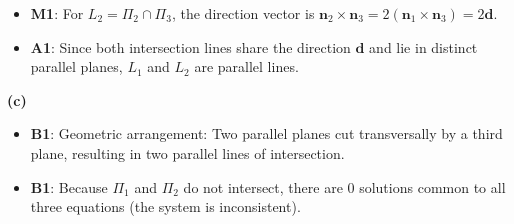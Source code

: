 \documentclass[11pt,a4paper]{article}
\begin{document}
{\begin{itemize}[leftmargin=1.5em, itemsep=2pt]
    \item \textbf{M1}: For $L_2 = \Pi_2 \cap \Pi_3$, the direction vector is $\mathbf{n}_2 \times \mathbf{n}_3 = 2(\mathbf{n}_1 \times \mathbf{n}_3) = 2\mathbf{d}$.
    \item \textbf{A1}: Since both intersection lines share the direction $\mathbf{d}$ and lie in distinct parallel planes, $L_1$ and $L_2$ are parallel lines.
  \end{itemize}
  \textbf{(c)}
  \begin{itemize}[leftmargin=1.5em, itemsep=2pt]
    \item \textbf{B1}: Geometric arrangement: Two parallel planes cut transversally by a third plane, resulting in two parallel lines of intersection.
    \item \textbf{B1}: Because $\Pi_1$ and $\Pi_2$ do not intersect, there are 0 solutions common to all three equations (the system is inconsistent).
  \end{itemize}
}

\end{document}
